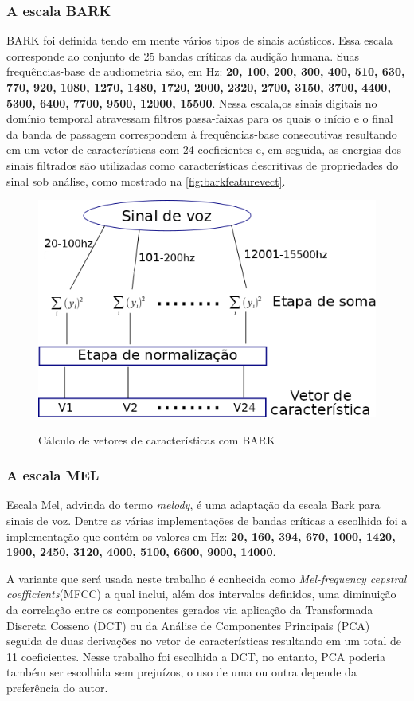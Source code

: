 		\subsubsection{A escala BARK}
			\par BARK foi definida tendo em mente vários tipos de sinais acústicos. Essa escala corresponde ao conjunto de 25 bandas críticas da audição humana. Suas frequências-base de audiometria são, em Hz: \textbf{20, 100, 200, 300, 400, 510, 630, 770, 920, 1080, 1270, 1480, 1720, 2000, 2320, 2700, 3150, 3700, 4400, 5300, 6400, 7700, 9500, 12000, 15500}. Nessa escala,os sinais digitais no domínio temporal atravessam filtros passa-faixas \cite{bosi2002introduction} para os quais o início e o final da banda de passagem correspondem à frequências-base consecutivas resultando em um vetor de características com 24 coeficientes e, em seguida, as energias dos sinais filtrados são utilizadas como características descritivas de propriedades do sinal sob análise, como mostrado na  \autoref{fig:barkfeaturevect}.
			\begin{figure}[h]
				\centering
				\caption{Cálculo de vetores de características com BARK}
				\includegraphics[width=0.6\linewidth]{images/barkFeatureVect}
				\label{fig:barkfeaturevect}
			\end{figure}
		
		\subsubsection{A escala MEL}
			\par Escala Mel, advinda do termo \textit{melody}, é uma adaptação da escala Bark para sinais de voz. Dentre as várias implementações de bandas críticas a escolhida foi a implementação que contém os valores em Hz: \textbf{20, 160, 394, 670, 1000, 1420, 1900, 2450, 3120, 4000, 5100, 6600, 9000, 14000}.
			
			\par A variante que será usada neste trabalho é conhecida como \textit{Mel-frequency cepstral coefficients}(MFCC) a qual inclui, além dos intervalos definidos, uma diminuição da correlação entre os componentes gerados via aplicação da Transformada Discreta Cosseno (DCT) \cite{salomon2007data} ou da Análise de Componentes Principais (PCA) \cite{jolliffe2006principal} seguida de duas derivações no vetor de características resultando em um total de 11 coeficientes. Nesse trabalho foi escolhida a DCT, no entanto, PCA poderia também ser escolhida sem prejuízos, o uso de uma ou outra depende da preferência do autor.
			
